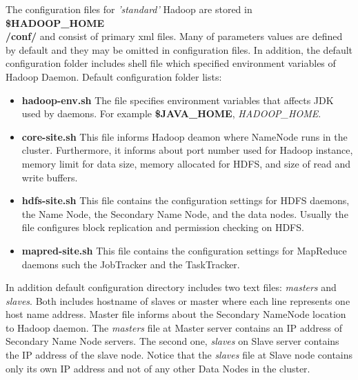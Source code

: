 \documentclass[a4paper,12pt,oneside]{report}
\begin{document}
	The configuration files for \textit{'standard'} Hadoop are stored in
	\textbf{\$HADOOP\_HOME\\/conf/} and consist of primary xml files. Many of parameters values  
	are defined by default and they may be omitted in configuration files. 
	In addition, the default configuration folder includes shell file which specified environment variables of Hadoop Daemon. Default configuration folder lists:
	\begin{itemize}\label{conf_files}
		\item \textbf{hadoop-env.sh} The file specifies environment variables that
		affects JDK used by daemons. For example \textbf{\$JAVA\_HOME}, \textit{HADOOP\_HOME}.
		\item \textbf{core-site.sh}   This file informs Hadoop deamon where NameNode
		runs in the cluster. Furthermore, it  
		informs about port number used for Hadoop instance, memory limit for data
		size,  memory allocated for HDFS, and size of read and write buffers.
		\item \textbf{hdfs-site.sh}  This file contains the configuration settings for
		HDFS daemons, the Name Node, the Secondary Name Node, and the data nodes. 
		Usually the file configures block replication and permission checking on HDFS. 
		\item \textbf{mapred-site.sh}  This file contains the configuration settings for
		MapReduce daemons such the JobTracker and the TaskTracker.
	\end{itemize}
	
	In addition default configuration directory includes two text files:
	\textit{masters} and \textit{slaves}. Both includes hostname of slaves or master 
	where each line represents one host name address. 
	Master file informs about the Secondary NameNode location to Hadoop daemon. The
	\textit{masters} file at Master server contains an IP address of Secondary Name Node servers.
	The second one, \textit{slaves} on Slave server contains the IP address of the
	slave node. Notice that the \textit{slaves} file at Slave node contains only its
	own IP address and not of any other Data Nodes in the cluster.
	
	
\end{document}
